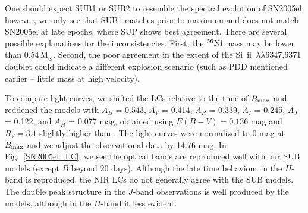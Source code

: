 \documentclass[useAMS,usenatbib,useasmath]{mnras}
\newcommand{\Msun}{\hbox{M$_\odot$}}
\newcommand{\elem}[2][default]{$^{#1}{\rm #2}$}
\newcommand{\skii}{\mbox{Si~{\sc ii}}}
\newcommand{\lb}{$\lambda$}
\def\fig{Fig.}
\begin{document}
One should expect SUB1 or SUB2 to resemble the spectral evolution of SN2005el; however, we only see that SUB1 matches prior to maximum and does not match SN2005el at late epochs, where SUP shows best agreement. There are several possible explanations for the inconsistencies. First, the \elem[56]{Ni} mass may be lower than 0.54\,\Msun. Second, the poor agreement in the extent of the \skii\ \lb\lb6347,6371 doublet could indicate a different explosion scenario (such as PDD mentioned earlier -- little mass at high velocity).

To compare light curves, we shifted the LCs relative to the time of $B_{\rm max}$ and  reddened the models with $A_B$ = 0.543, $A_V$ = 0.414, $A_R$ = 0.339, $A_I$ = 0.245, $A_J$ = 0.122, and $A_H$ = 0.077 mag, obtained using $E(B-V)=0.136$ mag and $R_V=3.1$ slightly higher than \cite{Scalzo2014a}. The light curves were normalized to 0 mag at $B_{\rm max}$ and we adjust the observational data by 14.76 mag. In \fig~\ref{SN2005el_LC}, we see the optical bands are reproduced well with our SUB models (except $B$ beyond 20 days). Although the late time behaviour in the $H$-band is reproduced, the NIR LCs do not generally agree with the SUB models. The double
peak structure in the $J$-band observations is well produced by the models, although in the $H$-band it less evident.
\end{document}

